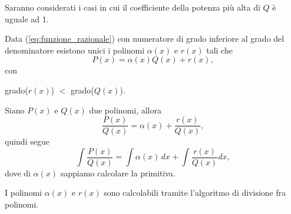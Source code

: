 Saranno considerati i casi in cui il coefficiente della potenza più alta di $Q$ è uguale ad 1.

\begin{proposition}
    Data (\ref{eq:funzione_razionale}) con numeratore di grado inferiore al grado del denominatore esistono unici i polinomi $\alpha(x)$ e $r(x)$ tali che
    \begin{equation*}
        P(x) =  \alpha(x) Q(x) + r(x),
    \end{equation*}
    con
    \begin{center}
        grado($r(x)$) $<$ grado($Q(x)$).
    \end{center}
\end{proposition}

\begin{remark}
    Siano $P(x)$ e $Q(x)$ due \gls{polinomi}, allora
    \begin{equation*}
        \frac{P(x)}{Q(x)}=\alpha(x)+\frac{r(x)}{Q(x)},
    \end{equation*}
    quindi segue
    \begin{equation*}
        \int \frac{P(x)}{Q(x)} = \int\alpha(x)\, dx + \int\frac{r(x)}{Q(x)} dx,
    \end{equation*}
    dove di $\alpha(x)$ sappiamo calcolare la primitiva.
\end{remark}

I polinomi $\alpha(x)$ e $r(x)$ sono calcolabili tramite l'algoritmo di divisione fra polinomi.

